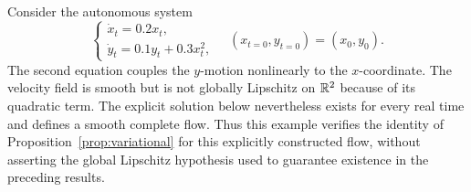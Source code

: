 \documentclass[12pt,a4paper,oneside]{book}
\begin{document}
\begin{example}
\label{ex:nonlinear-volume-deformation}
Consider the autonomous system
\begin{equation*}
    \begin{cases}
        \dot x_t=0.2x_t,\\
        \dot y_t=0.1y_t+0.3x_t^2,
    \end{cases}
    \quad (x_{t=0},y_{t=0})=(x_0,y_0).
\end{equation*}
The second equation couples the $y$-motion nonlinearly to the $x$-coordinate. The velocity field is smooth but is not globally
Lipschitz on $\mathbb{R}^2$ because of its quadratic term. The explicit solution below nevertheless exists for every real time
and defines a smooth complete flow. Thus this example verifies the identity of Proposition~\ref{prop:variational} for this explicitly
constructed flow, without asserting the global Lipschitz hypothesis used to guarantee existence in the preceding results.


\end{example}
\end{document}
